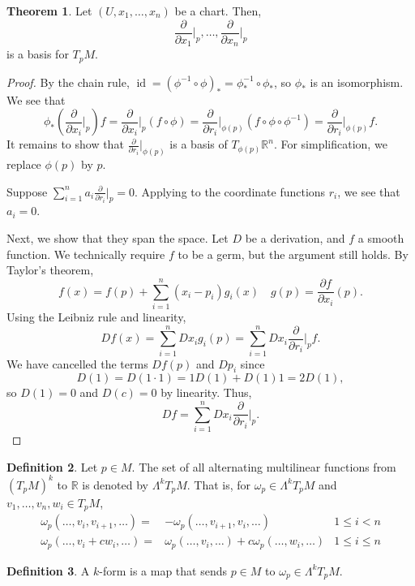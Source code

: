 \documentclass[]{article}
\DeclareMathOperator{\id}{id}
\theoremstyle{definition}
\newtheorem{theorem}{Theorem}[section] %
\theoremstyle{definition}
\newtheorem{definition}[theorem]{Definition} %
\begin{document}
\begin{theorem}
    Let $(U, x_1, \dots, x_n)$ be a chart. Then, \[\frac{\partial}{\partial x_1}\bigg|_p, \dots, \frac{\partial}{\partial x_n}\bigg|_p\] is a basis for $T_pM$.
\end{theorem}
\begin{proof}
    By the chain rule, $\id=(\phi^{-1}\circ\phi)_*=\phi^{-1}_*\circ \phi_*$, so $\phi_*$ is an isomorphism. We see that \[\phi_*\left(\frac{\partial}{\partial x_i}\bigg|_p\right)f=\frac{\partial}{\partial x_i}\bigg|_p(f\circ\phi)=\frac{\partial}{\partial r_i}\bigg|_{\phi(p)}(f\circ\phi\circ\phi^{-1})=\frac{\partial}{\partial r_i}|_{\phi(p)}f.\] It remains to show that $\frac{\partial}{\partial r_i}|_{\phi(p)}$ is a basis of $T_{\phi(p)}\mathbb{R}^n$. For simplification, we replace $\phi(p)$ by $p$.

    Suppose $\sum_{i=1}^{n}a_i\frac{\partial}{\partial r_i}|_{p}=0$. Applying to the coordinate functions $r_i$, we see that $a_i=0$.

    Next, we show that they span the space. Let $D$ be a derivation, and $f$ a smooth function. We technically require $f$ to be a germ, but the argument still holds. By Taylor's theorem, \[f(x)=f(p)+\sum_{i=1}^{n}(x_i-p_i)g_i(x)\quad g(p)=\frac{\partial f}{\partial x_i}(p).\] Using the Leibniz rule and linearity, \[Df(x)=\sum_{i=1}^{n}Dx_ig_i(p)=\sum_{i=1}^{n}Dx_i\frac{\partial}{\partial r_i}\bigg|_{p}f.\] We have cancelled the terms $Df(p)$ and $Dp_i$ since \[D(1)=D(1\cdot 1)=1D(1)+D(1)1=2D(1),\] so $D(1)=0$ and $D(c)=0$ by linearity. Thus, \[Df=\sum_{i=1}^{n}Dx_i\frac{\partial}{\partial r_i}\bigg|_{p}.\]
\end{proof}

\begin{definition}
    Let $p\in M$. The set of all alternating multilinear functions from $(T_pM)^k$ to $\mathbb{R}$ is denoted by $\Lambda^kT_pM$. That is, for $\omega_p\in\Lambda^kT_pM$ and $v_1, \dots, v_n, w_i\in T_pM$, \begin{align*}
        \omega_p(\dots, v_i, v_{i+1}, \dots)=&-\omega_p(\dots,  v_{i+1},v_i, \dots)&1\leq i<n\\
        \omega_p(\dots, v_i+cw_i, \dots)=&\omega_p(\dots, v_i, \dots)+c\omega_p(\dots, w_i, \dots)&1\leq i\leq n
    \end{align*}
\end{definition}

\begin{definition}
    A $k$-form is a map that sends $p\in M$ to $\omega_p\in \Lambda^kT_pM$.
\end{definition}
\end{document}
